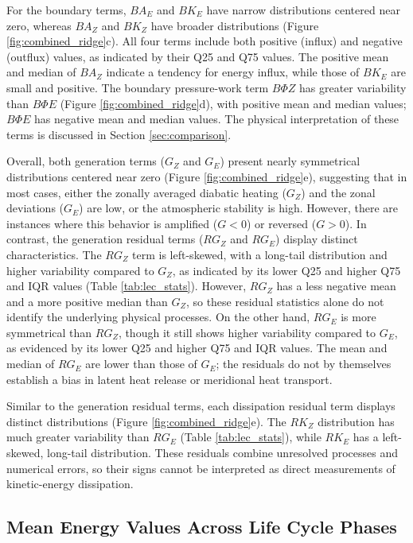 \documentclass[pdflatex,sn-chicago]{sn-jnl}%
\theoremstyle{plain}
\theoremstyle{definition}
\theoremstyle{remark}
\theoremstyle{definition}
\begin{document}
For the boundary terms, $BA_E$ and $BK_E$ have narrow distributions centered near zero, whereas $BA_Z$ and $BK_Z$ have broader distributions (Figure \ref{fig:combined_ridge}c). All four terms include both positive (influx) and negative (outflux) values, as indicated by their Q25 and Q75 values. The positive mean and median of $BA_Z$ indicate a tendency for energy influx, while those of $BK_E$ are small and positive. The boundary pressure-work term $B\Phi Z$ has greater variability than $B\Phi E$ (Figure \ref{fig:combined_ridge}d), with positive mean and median values; $B\Phi E$ has negative mean and median values. The physical interpretation of these terms is discussed in Section \ref{sec:comparison}.

Overall, both generation terms ($G_Z$ and $G_E$) present nearly symmetrical distributions centered near zero (Figure \ref{fig:combined_ridge}e), suggesting that in most cases, either the zonally averaged diabatic heating ($G_Z$) and the zonal deviations ($G_E$) are low, or the atmospheric stability is high. However, there are instances where this behavior is amplified ($G < 0$) or reversed ($G > 0$). In contrast, the generation residual terms ($RG_Z$ and $RG_E$) display distinct characteristics. The $RG_Z$ term is left-skewed, with a long-tail distribution and higher variability compared to $G_Z$, as indicated by its lower Q25 and higher Q75 and IQR values (Table \ref{tab:lec_stats}). However, $RG_Z$ has a less negative mean and a more positive median than $G_Z$, so these residual statistics alone do not identify the underlying physical processes. On the other hand, $RG_E$ is more symmetrical than $RG_Z$, though it still shows higher variability compared to $G_E$, as evidenced by its lower Q25 and higher Q75 and IQR values. The mean and median of $RG_E$ are lower than those of $G_E$; the residuals do not by themselves establish a bias in latent heat release or meridional heat transport.

Similar to the generation residual terms, each dissipation residual term displays distinct distributions (Figure \ref{fig:combined_ridge}e). The $RK_Z$ distribution has much greater variability than $RG_E$ (Table \ref{tab:lec_stats}), while $RK_E$ has a left-skewed, long-tail distribution. These residuals combine unresolved processes and numerical errors, so their signs cannot be interpreted as direct measurements of kinetic-energy dissipation.

\subsection{Mean Energy Values Across Life Cycle Phases}\label{sec:mean}
\end{document}
